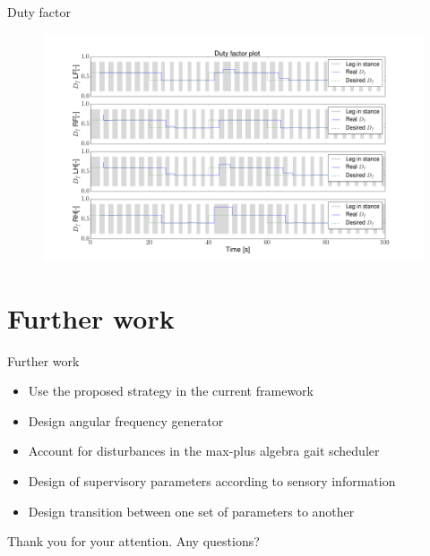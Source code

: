 \documentclass{beamer}
\begin{document}
\begin{frame}{Duty factor}
\vspace{-1cm}
	\begin{figure}[ht]\centering
		\includegraphics[width=1.1\textwidth]{images/DutyFactor.png}
	\end{figure}\vspace{-20pt}
\end{frame}


\section{Further work}


\begin{frame}{Further work}
	\begin{itemize}\setlength\itemsep{0.5em}
		\item Use the proposed strategy in the current framework
		\item Design angular frequency generator
		\item Account for disturbances in the max-plus algebra gait scheduler
		\item Design of supervisory parameters according to sensory information
		\item Design transition between one set of parameters to another
	\end{itemize}
\end{frame}

\begin{frame}
 \hspace{2cm} Thank you for your attention. Any questions?
\end{frame}
\end{document}

